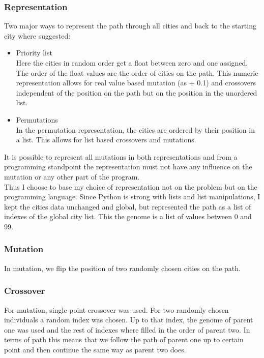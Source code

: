 \documentclass{scrartcl}
\begin{document}
\subsubsection{Representation}
Two major ways to represent the path through all cities and back to the starting city where suggested:
\begin{itemize}
\item Priority list\\
Here the cities in random order get a float between zero and one assigned. The order of the float values are the order of cities on the path. This numeric representation allows for real value based mutation (as + 0.1) and crossovers independent of the position on the path but on the position in the unordered list.
\item Permutations\\
In the permutation representation, the cities are ordered by their position in a list. This allows for list based crossovers and mutations.
\end{itemize}

It is possible to represent all mutations in both representations and from a programming standpoint the representation must not have any influence on the mutation or any other part of the program.\\
Thus I choose to base my choice of representation not on the problem but on the programming language. Since Python is strong with lists and list manipulations, I kept the cities data unchanged and global, but represented the path as a list of indexes of the global city list. This the genome is a list of values between 0 and 99.

\subsubsection{Mutation}
In mutation, we flip the position of two randomly chosen cities on the path.

\subsubsection{Crossover}
For mutation, single point crossover was used. For two randomly chosen individuals a random index was chosen. Up to that index, the genome of parent one was used and the rest of indexes where filled in the order of parent two. In terms of path this means that we follow the path of parent one up to certain point and then continue the same way as parent two does.
\end{document}
